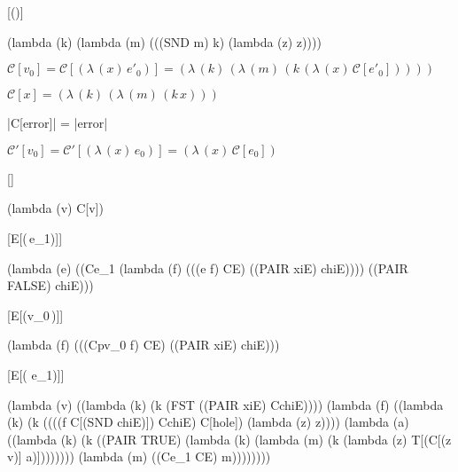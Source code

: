 \documentclass[ms,electronic,twosidetoc,letterpaper,chaptercenter,parttop]{byumsphd}
\newcommand{\C}[1]{\mathcal{C}[#1]}
\newcommand{\Cp}[1]{\mathcal{C}'[#1]}
\newcommand{\abs}[2]{(\lambda\,(#1)\,#2)}
\newcommand{\app}[2]{(#1\,#2)}
\newcommand{\wcm}[2]{(\mathrm{wcm}\,#1\,#2)}
\newcommand{\ccm}{(\mathrm{ccm})}
\newcommand{\hole}{\bullet}
\begin{document}
\begin{schemedefn}{\C{\ccm}}
\begin{schemedisplay}
(lambda (k) (lambda (m) (((SND m) k) (lambda (z) z))))
\end{schemedisplay}
\end{schemedefn}

\begin{defn}
$\C{v_0}=\C{\abs{x}{e'_0}}=\abs{k}{\abs{m}{\app{k}{\abs{x}{\C{e'_0}}}}}$
\end{defn}

\begin{defn}
$\C{x}=\abs{k}{\abs{m}{\app{k}{x}}}$
\end{defn}

\begin{defn}
\scheme|C[error]| = \scheme|error|
\end{defn}

\begin{defn}
$\Cp{v_0}=\Cp{\abs{x}{e_0}}=\abs{x}{\C{e_0}}$
\end{defn}

\begin{schemedefn}{\C{\hole}}
\begin{schemedisplay}
(lambda (v) C[v])
\end{schemedisplay}
\end{schemedefn}

\begin{schemedefn}{\C{E[\app{\hole}{e_1}]}}
\begin{schemedisplay}
(lambda (e) ((Ce_1
              (lambda (f) (((e f) CE) ((PAIR xiE) chiE))))
             ((PAIR FALSE) chiE)))
\end{schemedisplay}
\end{schemedefn}

\begin{schemedefn}{\C{E[\app{v_0}{\hole}]}}
\begin{schemedisplay}
(lambda (f) (((Cpv_0 f) CE) ((PAIR xiE) chiE)))
\end{schemedisplay}
\end{schemedefn}

\begin{schemedefn}{\C{E[\wcm{\hole}{e_1}]}}
\begin{schemedisplay}
(lambda (v) 
  ((lambda (k) (k (FST ((PAIR xiE) CchiE))))
   (lambda (f) 
     ((lambda (k) (k ((((f C[(SND chiE)]) CchiE) C[hole]) (lambda (z) z))))
      (lambda (a)
        ((lambda (k) (k ((PAIR TRUE) (lambda (k) (lambda (m) (k (lambda (z) T[(C[(z v)] a)])))))))
         (lambda (m) ((Ce_1 CE) m))))))))
\end{schemedisplay}
\end{schemedefn}
\end{document}

